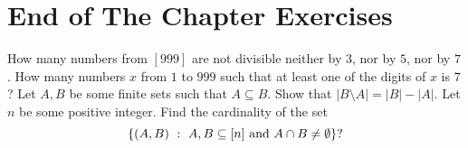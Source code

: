 \section*{End of The Chapter Exercises}
\begin{exercises}
  \exercise How many numbers from $[999]$ are not divisible neither by $3$,
    nor by $5$, nor by $7$.
  \exercise How many numbers $x$ from $1$ to $999$ such that at least one
    of the digits of $x$ is $7$?
  \exercise Let $A, B$ be some finite sets such that $A \subseteq B$.
    Show that $|B \setminus A| = |B| - |A|$.
  \exercise Let $n$ be some positive integer.
    Find the cardinality of the set
    \[
      \set[{A, B \subseteq [n] \text{ and } A \cap B \neq \emptyset}]{(A, B)}?
    \]
\end{exercises}
